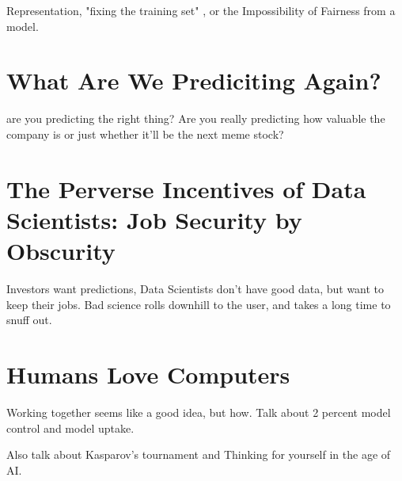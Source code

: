 Representation, "fixing the training set" , or the Impossibility of Fairness from a model.

\section{What Are We Prediciting Again?}

are you predicting the right thing? Are you really predicting how valuable the company is or just whether it'll be the next meme stock?

\section{The Perverse Incentives of Data Scientists: Job Security by Obscurity}

Investors want predictions, Data Scientists don't have good data, but want to keep their jobs. Bad science rolls downhill to the user, and takes a long time to snuff out. 

\section{Humans Love Computers}

Working together seems like a good idea, but how. Talk about 2 percent model control and model uptake. 

Also talk about Kasparov's tournament and Thinking for yourself in the age of AI. 


